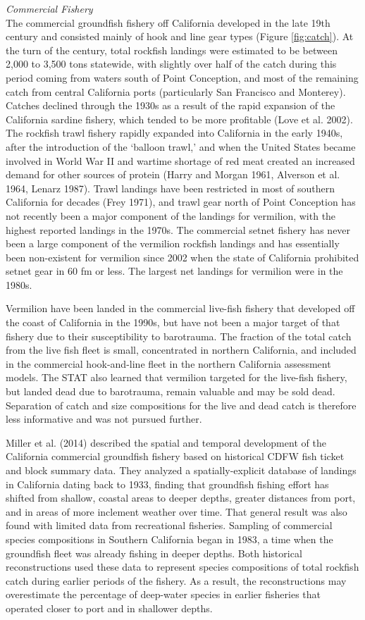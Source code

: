 \documentclass[
  english,
  a4paper,
]{article}
\begin{document}
\emph{Commercial Fishery}\\
The commercial groundfish fishery off California developed in the late 19th
century and consisted mainly of hook and line gear types (Figure \ref{fig:catch}).
At the turn of the century, total rockfish landings were estimated to be between
2,000 to 3,500 tons statewide, with slightly over half of the catch during this
period coming from waters south of Point Conception, and most of the remaining
catch from central California ports (particularly San Francisco and Monterey).
Catches declined through the 1930s as a result of the rapid expansion of the
California sardine fishery, which tended to be more profitable (Love et al. 2002).
The rockfish trawl fishery rapidly expanded into California in the early 1940s,
after the introduction of the `balloon trawl,' and when the United States became
involved in World War II and wartime shortage of red
meat created an increased demand for other sources of protein (Harry and Morgan 1961, Alverson et al. 1964, Lenarz 1987). Trawl landings have been restricted in most of southern
California for decades (Frey 1971), and trawl gear north of Point Conception has
not recently been a major component of the landings for vermilion, with the
highest reported landings in the 1970s. The commercial setnet fishery has never
been a large component of the vermilion rockfish landings and has essentially
been non-existent for vermilion since 2002 when the state of California prohibited
setnet gear in 60 fm or less. The largest net landings for vermilion were in the 1980s.

Vermilion have been landed in the commercial live-fish fishery that developed
off the coast of
California in the 1990s, but have not been a major target of that fishery due
to their susceptibility to barotrauma. The fraction of the total catch
from the live fish fleet is small, concentrated in northern California, and
included in the commercial hook-and-line fleet in the northern California
assessment models. The STAT also learned that vermilion targeted for the live-fish
fishery, but landed dead due to barotrauma, remain valuable and may be sold dead.
Separation of catch and size compositions for the live and dead catch is therefore
less informative and was not pursued further.

Miller et al. (2014) described the spatial and temporal development of the
California commercial groundfish fishery based on historical CDFW fish ticket
and block summary data. They analyzed a spatially-explicit database of
landings in California dating back to 1933, finding that groundfish fishing effort
has shifted from shallow, coastal areas to deeper depths, greater distances from
port, and in areas of more inclement weather over time. That general result was
also found with limited data from recreational fisheries. Sampling of commercial
species compositions in Southern California began in 1983, a time when the
groundfish fleet was already fishing in deeper depths.
Both historical reconstructions used these data to represent species compositions of
total rockfish catch during earlier periods of the fishery. As a result, the
reconstructions may overestimate the percentage of deep-water species in earlier
fisheries that operated closer to port and in shallower depths.
\end{document}
